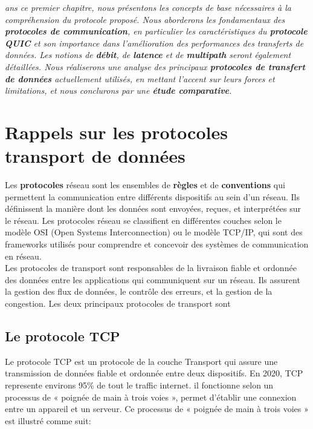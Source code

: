 \textit{ans ce premier chapitre, nous présentons les concepts de base nécessaires à la compréhension du protocole proposé. Nous aborderons les fondamentaux des \textbf{protocoles de communication}, en particulier les caractéristiques du \textbf{protocole QUIC} et son importance dans l’amélioration des performances des transferts de données. Les notions de \textbf{débit}, de \textbf{latence} et de \textbf{multipath} seront également détaillées. Nous réaliserons une analyse des principaux \textbf{protocoles de transfert de données} actuellement utilisés, en mettant l’accent sur leurs forces et limitations, et nous conclurons par une \textbf{étude comparative}.}

\newpage    

\section{Rappels sur les protocoles transport de données}
Les \textbf{protocoles} réseau sont les ensembles de \textbf{règles} et de \textbf{conventions} qui permettent la communication entre différents dispositifs au sein d'un réseau. Ils définissent la manière dont les données sont envoyées, reçues, et interprétées sur le réseau. Les protocoles réseau se classifient en différentes couches selon le modèle OSI (Open Systems Interconnection) ou le modèle TCP/IP, qui sont des frameworks utilisés pour comprendre et concevoir des systèmes de communication en réseau.\\

Les protocoles de transport sont responsables de la livraison fiable et ordonnée des données entre les applications qui communiquent sur un réseau. Ils assurent la gestion des flux de données, le contrôle des erreurs, et la gestion de la congestion. Les deux principaux protocoles de transport sont

\subsection{Le protocole TCP}
Le protocole TCP est un protocole de la couche Transport qui assure une transmission de données fiable et ordonnée entre deux dispositifs. En 2020, TCP represente environs 95\%\cite{ipierre-giraud-2020} de tout le traffic internet. il fonctionne selon un processus de « poignée de main à trois voies », permet d’établir une connexion entre un appareil et un serveur. Ce processus de « poignée de main à trois voies » est illustré comme suit\cite{gorman-2023}:

